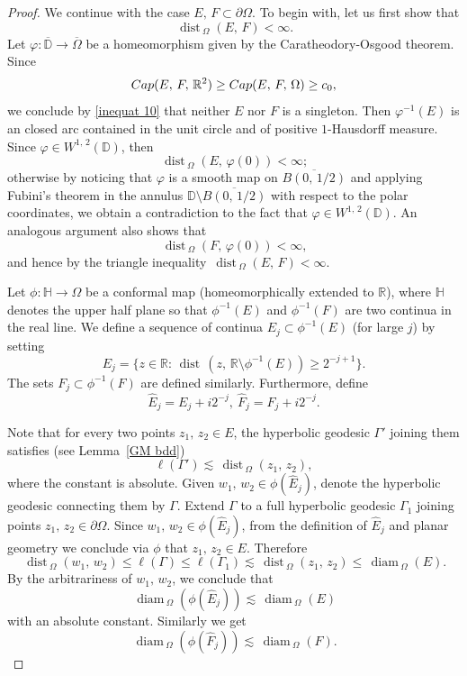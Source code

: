 \documentclass[10pt,a4paper]{amsart}
\def\diam{{\mathop\mathrm{\,diam\,}}}
\def\dist{{\mathop\mathrm{\,dist\,}}}
\begin{document}
\begin{proof}
 We continue with the case $E,\,F\subset\partial\Omega$. 
To begin with, let us first show that 
$$\dist_{\Omega}(E,\,F)<\infty. $$
Let $\varphi\colon \overline{\mathbb D} \to \overline{\Omega}$ be a homeomorphism given by the Caratheodory-Osgood theorem. 
Since 
$${\rm Cap}(E,\,F,\, \mathbb R^2)\ge {\rm Cap}(E,\,F,\, \Omega)\ge c_0,$$
we conclude by \eqref{inequat 10} that neither $E$ nor $F$ is a singleton. 
Then $\varphi^{-1}(E)$ is an closed arc contained in the unit circle and of positive $1$-Hausdorff measure. Since $\varphi\in W^{1,\,2}(\mathbb D)$, then
$$\dist_{\Omega}(E,\,\varphi(0))<\infty;$$
otherwise by noticing that $\varphi$ is a smooth map on $\overline{B(0,\,1/2)}$ and applying Fubini's theorem  in the annulus $\mathbb D \setminus \overline{B(0,\,1/2)}$ with respect to the polar coordinates, we obtain a contradiction to the fact that $\varphi\in W^{1,\,2}(\mathbb D)$. 
An analogous argument also shows that 
$$\dist_{\Omega}(F,\,\varphi(0))<\infty,$$
and hence by the triangle inequality $\dist_{\Omega}(E,\,F)<\infty. $



Let $\phi\colon \mathbb H\to \Omega$ be a conformal map (homeomorphically extended  to  $\mathbb R$), where $\mathbb H$ denotes the upper half plane so that $\phi^{-1}(E)$ and $\phi^{-1}(F)$ are two continua in the real line. 
We define a sequence of continua $E_j \subset  \phi^{-1}(E)$ (for large $j$) by setting
$$ E_j =\{ z \in \mathbb R \colon   \dist(z,\,\mathbb R \setminus \phi^{-1}(E))\ge 2^{-j+1}\}. $$
The sets $ F_j\subset \phi^{-1}(F)$ are defined similarly. 
Furthermore, define
$$\hat E_j= E_j +i  2^{-j}, \ \hat F_j= F_j +i 2^{-j}. $$


Note that for every two points $z_1,\,z_2\in E$, the hyperbolic geodesic $\Gamma'$ joining them satisfies (see Lemma~\ref{GM bdd})
$$\ell(\Gamma')\lesssim \dist_{\Omega}(z_1,\,z_2), $$
where the constant is absolute. 
Given $w_1,\,w_2\in \phi(\hat E_j)$, denote the hyperbolic geodesic connecting them by $\Gamma$. Extend $\Gamma$ to a full hyperbolic geodesic $\Gamma_1$ joining points $z_1,\,z_2\in \partial \Omega$. Since $w_1,\,w_2\in \phi(\hat E_j)$, from the definition of $\hat E_j$ and planar geometry  we conclude via $\phi$ that $z_1,\,z_2\in  E$. Therefore
$$\dist_{\Omega}(w_1,\,w_2)\le \ell(\Gamma)\le \ell(\Gamma_1)\lesssim \dist_{\Omega}(z_1,\,z_2)\le \diam_{\Omega}(E). $$
By the arbitrariness of $w_1,\,w_2$, we conclude that
\begin{equation}\label{inequ 19}
\diam_{\Omega}(\phi(\hat E_j)) \lesssim  \diam_{\Omega}(E) 
\end{equation}
with an absolute constant. Similarly we get  
\begin{equation}\label{inequ 20}
\diam_{\Omega}(\phi(\hat F_j)) \lesssim  \diam_{\Omega}(F). 
\end{equation}


\end{proof}
\end{document}
